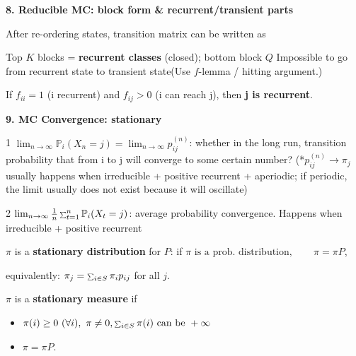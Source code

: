 \documentclass[a4paper, landscape]{article}
\newcommand{\topic}[1]{\par\medskip\textbf{#1}\par}
\newcommand{\subtopic}[1]{\par\textbf{#1}}
\newcommand{\smallsum}{\mathop{\scalebox{0.65}{$\sum$}}\nolimits}
\renewcommand{\topic}[1]{\par\medskip\noindent\colorbox{highlightcolor}{\parbox{\dimexpr\columnwidth-2\fboxsep\relax}{\textbf{#1}}}\par}
\renewcommand{\subtopic}[1]{\par\textbf{\color{blue}{#1}}} %
\begin{document}
\begin{multicols}{4}
\newpage
\thispagestyle{empty}
\null
\newpage

\topic{8. Reducible MC: block form \& recurrent/transient parts}
\subtopic{Reducible MC (finite state space):} After re-ordering states, transition matrix can be written as\\
\vspace{2cm}

Top $K$ blocks = \textbf{recurrent classes} (closed); bottom block $Q$ Impossible to go from recurrent state to transient state(Use $f$-lemma / hitting argument.)

\subtopic{$f$-lemma (very exam-use):}
If $f_{ii}=1$ (i recurrent) and $f_{ij}>0$ (i can reach j), then \textbf{j is recurrent}.\\


\topic{9. MC Convergence: stationary}
\subtopic{Two common limits:}
\par1 $\lim_{n\to\infty}\mathbb P_i(X_n=j)=\lim_{n\to\infty}p^{(n)}_{ij}$: whether in the long run, transition probability that from i to j will converge to some certain number? (*$p^{(n)}_{ij}\xrightarrow{}{\pi_j}$ usually happens when irreducible + positive recurrent + aperiodic; if periodic, the limit usually does not exist because it will oscillate)\\

\par2 $\lim_{n\to\infty}\frac1n\smallsum_{t=1}^n \mathbb P_i(X_t=j)$: average probability convergence. Happens when irreducible + positive recurrent

\subtopic{Stationary distribution:}
$\pi$ is a \textbf{stationary distribution} for $P$: if $\pi \text{ is a prob. distribution},\qquad \pi=\pi P$,

equivalently: $\pi_j=\smallsum_{i\in S}\pi_i p_{ij}$ for all $j$.

\subtopic{Stationary measure (relax normalization):}
$\pi$ is a \textbf{stationary measure} if
\begin{itemize}
    \item $\pi(i)\ge0\ (\forall i),\ \pi\neq 0, \smallsum_{i\in S}\pi(i)\ \text{can be }+\infty$
    \item $\pi=\pi P.$
\end{itemize}



\end{multicols}
\end{document}
